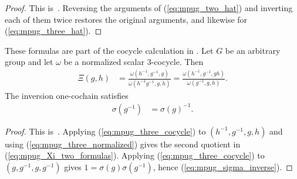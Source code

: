 \begin{proof}\leanok
    This is~\cite[``The hat operation is an involution'']{QICLean2026Blueprint}.
    Reversing the arguments of (\ref{eq:mpug_two_hat}) and inverting each of
    them twice restores the original arguments, and likewise for
    (\ref{eq:mpug_three_hat}).
\end{proof}

\begin{lemma}
    \label{thm:mpug_inversion_cochain_formulas}
    \leanok
    These formulas are part of the cocycle calculation in
    \cite[lines~5967--5979]{FrancoRubio2025MPUGauging}.
    Let $G$ be an arbitrary group and let $\omega$ be a normalized scalar
    $3$-cocycle. Then
    \begin{align}
        \Xi(g,h) & =
        \frac{\omega(h^{-1},g^{-1},g)}
        {\omega(h^{-1}g^{-1},g,h)}
        =
        \frac{\omega(h^{-1},g^{-1},gh)}
        {\omega(g^{-1},g,h)}.
        \label{eq:mpug_Xi_two_formulas}
    \end{align}
    The inversion one-cochain satisfies
    \begin{align}
        \sigma(g^{-1}) & =\sigma(g)^{-1}.
        \label{eq:mpug_sigma_inverse}
    \end{align}
\end{lemma}

\begin{proof}\leanok
    This is~\cite[``Two inversion-cochain formulas'']{QICLean2026Blueprint}.
    Applying (\ref{eq:mpug_three_cocycle}) to $(h^{-1},g^{-1},g,h)$ and using
    (\ref{eq:mpug_three_normalized}) gives the second quotient in
    (\ref{eq:mpug_Xi_two_formulas}). Applying
    (\ref{eq:mpug_three_cocycle}) to
    $(g,g^{-1},g,g^{-1})$ gives
    $1=\sigma(g)\sigma(g^{-1})$, hence
    (\ref{eq:mpug_sigma_inverse}).
\end{proof}

